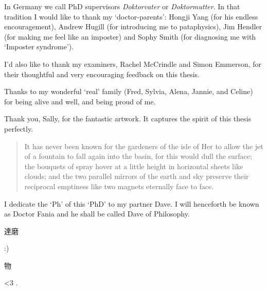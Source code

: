 
\pagestyle{fania}

\begin{wrapfigure}{L}{0.2\textwidth}
\end{wrapfigure}


In Germany we call PhD supervisors \textit{Doktorvater} or \textit{Doktormutter}. In that tradition I would like to thank my `doctor-parents': Hongji Yang (for his endless encouragement), Andrew Hugill (for introducing me to pataphysics), Jim Hendler (for making me feel like an imposter) and Sophy Smith (for diagnosing me with `Imposter syndrome').

I'd also like to thank my examiners, Rachel McCrindle and Simon Emmerson, for their thoughtful and very encouraging feedback on this thesis.

Thanks to my wonderful `real' family (Fred, Sylvia, Alena, Jannie, and Celine) for being alive and well, and being proud of me.

Thank you, Sally, for the fantastic artwork. It captures the spirit of this thesis perfectly.


\spirals


\begin{quotation}
  It has never been known for the gardeners of the isle of Her to allow the jet of a fountain to fall again into the basin, for this would dull the surface; the bouquets of spray hover at a little height in horizontal sheets like clouds; and the two parallel mirrors of the earth and sky preserve their reciprocal emptiness like two magnets eternally face to face. 
\end{quotation}

I dedicate the `Ph' of this `PhD' to my partner Dave. I will henceforth be known as Doctor Fania and he shall be called Dave of Philosophy. 

\hspace{0cm}\textipa{[rI"mEmb@ Ti:]} \begin{CJK}{UTF8}{min}達磨\end{CJK} :) \textipa{["h\ae pi} \begin{CJK}{UTF8}{min}物\end{CJK} \textipa{"v3:s@ri]} <3 . 


